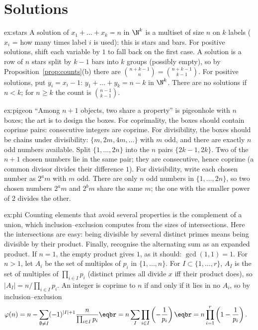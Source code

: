 \section{Solutions}
\begin{solution}{ex:stars}
\idea A solution of $x_1+\dots+x_k=n$ in $\N^k$ is a multiset of size $n$ on $k$ labels ($x_i$ = how many times label $i$ is used): this is stars and bars. For positive solutions, shift each variable by $1$ to fall back on the first case.
\writeup A solution is a row of $n$ stars split by $k-1$ bars into $k$ groups (possibly empty), so by Proposition~\ref{prop:counts}(b) there are $\binom{n+k-1}{n}=\binom{n+k-1}{k-1}$. For positive solutions, put $y_i=x_i-1$:
$y_1+\dots+y_k=n-k$ in $\N^k$. There are no solutions if $n<k$; for $n\ge k$ the count is $\binom{n-1}{k-1}$.
\end{solution}

\begin{solution}{ex:pigeon}
\idea ``Among $n+1$ objects, two share a property'' is pigeonhole with $n$ boxes; the art is to design the boxes. For coprimality, the boxes should contain coprime pairs: consecutive integers are coprime. For divisibility, the boxes should be chains under divisibility: $\{m,2m,4m,\dots\}$ with $m$ odd, and there are exactly $n$ odd numbers available.
\writeup Split $\{1,\dots,2n\}$ into the $n$ pairs $\{2k-1,2k\}$. Two of the $n+1$ chosen numbers lie in the same pair; they are consecutive, hence coprime (a common divisor divides their difference $1$).
For divisibility, write each chosen number as $2^am$ with $m$ odd. There are only $n$ odd numbers in $\{1,\dots,2n\}$, so two chosen numbers $2^am$ and $2^bm$ share the same $m$;
the one with the smaller power of $2$ divides the other.
\end{solution}

\begin{solution}{ex:phi}
\idea Counting elements that avoid several properties is the complement of a union, which inclusion--exclusion computes from the sizes of intersections. Here the intersections are easy: being divisible by several distinct primes means being divisible by their product. Finally, recognise the alternating sum as an expanded product.
\writeup If $n=1$, the empty product gives $1$, as it should: $\gcd(1,1)=1$. For $n>1$, let $A_i$ be the set of multiples of $p_i$ in $\{1,\dots,n\}$. For $I\subset\{1,\dots,r\}$, $A_I$ is the set of multiples of $\prod_{i\in I}p_i$ (distinct primes all divide $x$ iff their product does), so $|A_I|=n/\prod_{i\in I}p_i$.
An integer is coprime to $n$ if and only if it lies in no $A_i$, so by inclusion--exclusion
\[
\begin{aligned}\varphi(n)&=n-\sum_{\emptyset\ne I}(-1)^{|I|+1}\frac n{\prod_{i\in I}p_i}\eqbr=n\sum_{I}\prod_{i\in I}\left(-\frac1{p_i}\right)\eqbr=n\prod_{i=1}^r\left(1-\frac1{p_i}\right).\end{aligned}
\]
\end{solution}

